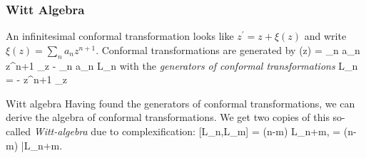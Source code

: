 \subsubsection{Witt Algebra}
An infinitesimal conformal transformation looks like $z^\prime = z + \xi(z)$ and write $\xi(z)=\sum_n a_n z^{n+1}$. Conformal transformations are generated by 
\bse 
\xi(z)  = \sum_n a_n z^{n+1} \partial_z \equiv - \sum_n a_n L_n
\ese 
with the \emph{generators of conformal transformations}
\be 
L_n = - z^{n+1} \partial_z 
\ee
{}
\begin{mybox}{Witt algebra}
	Having found the generators of conformal transformations, we can derive the algebra of conformal transformations. We get two copies of this so-called \emph{Witt-algebra} due to complexification:
	\be 
	\label{eq:cftWittalgebra}
	[L_n,L_m] = (n-m) L_{n+m},\quad {}  = (n-m) \bar{L}_{n+m}.
	\ee
\end{mybox}
